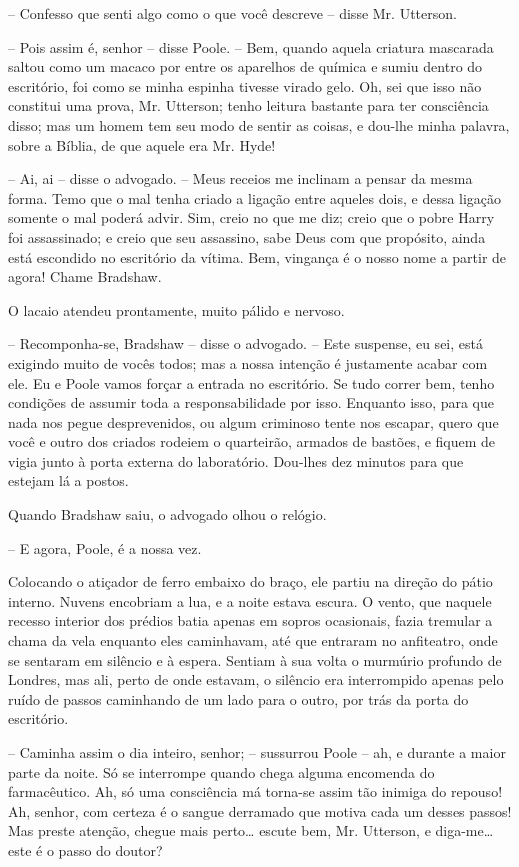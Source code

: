 -- Confesso que senti algo como o que você descreve -- disse Mr.
Utterson.

-- Pois assim é, senhor -- disse Poole. -- Bem, quando aquela criatura
mascarada saltou como um macaco por entre os aparelhos de química e
sumiu dentro do escritório, foi como se minha espinha tivesse virado
gelo.  Oh, sei que isso não constitui uma prova, Mr. Utterson; tenho
leitura bastante para ter consciência disso; mas um homem tem seu modo
de sentir as coisas, e dou-lhe minha palavra, sobre a Bíblia, de que
aquele era Mr. Hyde!

-- Ai, ai -- disse o advogado. -- Meus receios me inclinam a pensar da
mesma forma. Temo que o mal tenha criado a ligação entre aqueles dois,
e dessa ligação somente o mal poderá advir.  Sim, creio no que me diz;
creio que o pobre Harry foi assassinado; e creio que seu assassino,
sabe Deus com que propósito, ainda está escondido no escritório da
vítima.  Bem, vingança é o nosso nome a partir de agora!  Chame
Bradshaw.

O lacaio atendeu prontamente, muito pálido e nervoso.

-- Recomponha-se, Bradshaw -- disse o advogado. -- Este suspense, eu sei,
está exigindo muito de vocês todos; mas a nossa intenção é justamente
acabar com ele.  Eu e Poole vamos forçar a entrada no escritório.  Se
tudo correr bem, tenho condições de assumir toda a responsabilidade por
isso.  Enquanto isso, para que nada nos pegue desprevenidos, ou algum
criminoso tente nos escapar, quero que você e outro dos criados rodeiem
o quarteirão, armados de bastões, e fiquem de vigia junto à porta
externa do laboratório.  Dou-lhes dez minutos para que estejam lá a
postos.

Quando Bradshaw saiu, o advogado olhou o relógio.

-- E agora, Poole, é a nossa vez.

Colocando o atiçador de ferro embaixo do braço, ele partiu na direção do
pátio interno.  Nuvens encobriam a lua, e a noite estava escura.  O
vento, que naquele recesso interior dos prédios batia apenas em sopros
ocasionais, fazia tremular a chama da vela enquanto eles caminhavam,
até que entraram no anfiteatro, onde se sentaram em silêncio e à
espera.  Sentiam à sua volta o murmúrio profundo de Londres, mas ali,
perto de onde estavam, o silêncio era interrompido apenas pelo ruído de
passos caminhando de um lado para o outro, por trás da porta do
escritório.

-- Caminha assim o dia inteiro, senhor; -- sussurrou Poole -- ah, e
durante a maior parte da noite.  Só se interrompe quando chega alguma
encomenda do farmacêutico.  Ah, só uma consciência má torna-se assim
tão inimiga do repouso! Ah, senhor, com certeza é o sangue derramado
que motiva cada um desses passos!  Mas preste atenção, chegue mais
perto\ldots{} escute bem, Mr. Utterson, e diga-me\ldots{} este é o passo do
doutor?

